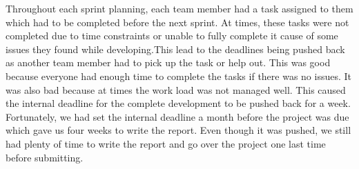 \documentclass[a4paper]{report}
\begin{document}
	Throughout each sprint planning, each team member had a task assigned to them which had to be completed before the next sprint. At times, these tasks were not completed due to time constraints or unable to fully complete it cause of some issues they found while developing.This lead to the deadlines being pushed back as another team member had to pick up the task or help out. This was good because everyone had enough time to complete the tasks if there was no issues. It was also bad because at times the work load was not managed well. This caused the internal deadline for the complete development to be pushed back for a week. Fortunately, we had set the internal deadline a month before the project was due which gave us four weeks to write the report. Even though it was pushed, we still had plenty of time to write the report and go over the project one last time before submitting.\\
	
	
	
	
	
	
	
	
	
	
	
	\clearpage
	
	
\end{document}
